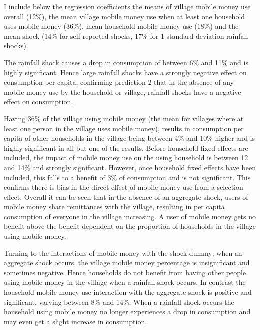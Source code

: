 I include below the regression coefficients the means of village mobile money use overall (12\%), the mean village mobile money use when at least one household uses mobile money (36\%), mean household mobile money use (18\%) and the mean shock (14\% for self reported shocks, 17\% for 1 standard deviation rainfall shocks).

The rainfall shock causes a drop in consumption of between 6\% and 11\% and is highly significant. Hence large rainfall shocks have a strongly negative effect on consumption per capita, confirming prediction 2 that in the absence of any mobile money use by the household or village, rainfall shocks have a negative effect on consumption.  

Having 36\% of the village using mobile money (the mean for villages where at least one person in the village uses mobile money), results in consumption per capita of other households in the village being between 4\% and 10\% higher and is highly significant in all but one of the results. Before household fixed effects are included, the impact of mobile money use on the using household is between 12 and 14\% and strongly significant. However, once household fixed effects have been included, this falls to a benefit of 3\% of consumption and is not significant. This confirms there is bias in the direct effect of mobile money use from a selection effect. Overall it can be seen that in the absence of an aggregate shock, users of mobile money share remittances with the village, resulting in per capita consumption of everyone in the village increasing. A user of mobile money gets no benefit above the benefit dependent on the proportion of households in the village using mobile money. 

Turning to the interactions of mobile money with the shock dummy; when an aggregate shock occurs, the village mobile money percentage is insignificant and sometimes negative. Hence households do not benefit from having other people using mobile money in the village when a rainfall shock occurs. In contrast the household mobile money use interaction with the aggregate shock is positive and significant, varying between 8\% and 14\%. When a rainfall shock occurs the household using mobile money no longer experiences a drop in consumption and may even get a slight increase in consumption. 

